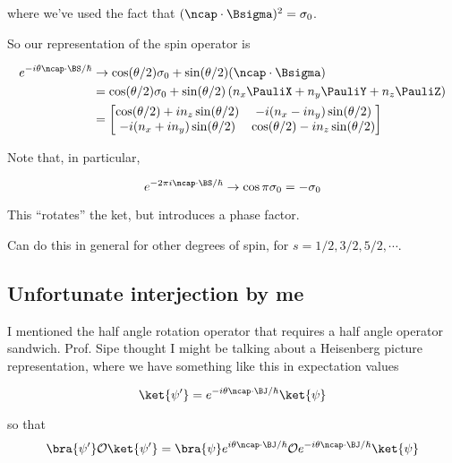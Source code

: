 where we've used the fact that $(\ncap \cdot \Bsigma)^2 = \sigma_0$.

So our representation of the spin operator is

\begin{equation}\label{eqn:qmTwoL15:30}
\begin{aligned}
e^{-i \theta \ncap \cdot \BS/\hbar} 
&\rightarrow
\cos(\theta/2) \sigma_0 + \sin(\theta/2) (\ncap \cdot \Bsigma) \\
&=
\cos(\theta/2) \sigma_0 + \sin(\theta/2) 
\left(n_x \PauliX + n_y \PauliY + n_z \PauliZ \right) \\
&=
\begin{bmatrix}
\cos(\theta/2) +i n_z \sin(\theta/2) & -i (n_x -i n_y) \sin(\theta/2) \\
-i (n_x + i n_y) \sin(\theta/2) & \cos(\theta/2) -i n_z \sin(\theta/2) 
\end{bmatrix}
\end{aligned}
\end{equation}

Note that, in particular, 

\begin{equation}\label{eqn:qmTwoL15:50}
e^{-2 \pi i \ncap \cdot \BS/\hbar} \rightarrow \cos\pi \sigma_0 = -\sigma_0
\end{equation}

This ``rotates'' the ket, but introduces a phase factor.

Can do this in general for other degrees of spin, for $s = 1/2, 3/2, 5/2, \cdots$.

\subsection{Unfortunate interjection by me}

I mentioned the half angle rotation operator that requires a half angle operator sandwich.  Prof. Sipe thought I might be talking about a Heisenberg picture representation, where we have something like this in expectation values

\begin{equation}\label{eqn:qmTwoL15:70}
\ket{\psi'} = e^{-i \theta \ncap \cdot \BJ/\hbar} \ket{\psi}
\end{equation}

so that 
\begin{equation}\label{eqn:qmTwoL15:90}
\bra{\psi'}
\mathcal{O}
\ket{\psi'} = \bra{\psi} 
e^{i \theta \ncap \cdot \BJ/\hbar} 
\mathcal{O}
e^{-i \theta \ncap \cdot \BJ/\hbar} 
\ket{\psi}
\end{equation}


